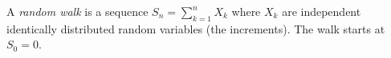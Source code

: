 A \textit{random walk} is a sequence $S_n = \sum_{k=1}^{n} X_k$ where $X_k$ are independent identically distributed random variables (the increments). The walk starts at $S_0 = 0$.
